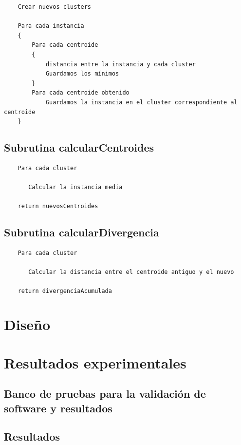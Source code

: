 \documentclass[a4paper]{report}
\begin{document}
	\begin{verbatim}
	Crear nuevos clusters 
	
	Para cada instancia
	{
	    Para cada centroide
	    {
	        distancia entre la instancia y cada cluster
	        Guardamos los mínimos 
	    }    
	    Para cada centroide obtenido
	        Guardamos la instancia en el cluster correspondiente al centroide
	}
	\end{verbatim}
	
	\section{Subrutina calcularCentroides}
	
	\begin{verbatim}
	Para cada cluster
	
	   Calcular la instancia media
	   
	return nuevosCentroides
	\end{verbatim}
	
	\section{Subrutina calcularDivergencia}
	
	\begin{verbatim}
	Para cada cluster 
	   
	   Calcular la distancia entre el centroide antiguo y el nuevo
	   
	return divergenciaAcumulada
	\end{verbatim}

\chapter{Diseño}



\chapter{Resultados experimentales}

	\section{Banco de pruebas para la validación de software y resultados}
	
	\section{Resultados}
	
\end{document}
